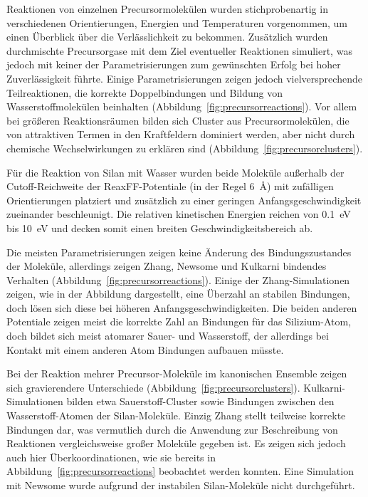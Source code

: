 Reaktionen von einzelnen Precursormolekülen wurden stichprobenartig in verschiedenen Orientierungen, Energien und Temperaturen vorgenommen, um einen Überblick über die Verlässlichkeit zu bekommen.
Zusätzlich wurden durchmischte Precursorgase mit dem Ziel eventueller Reaktionen simuliert, was jedoch mit keiner der Parametrisierungen zum gewünschten Erfolg bei hoher Zuverlässigkeit führte.
Einige Parametrisierungen zeigen jedoch vielversprechende Teilreaktionen, die korrekte Doppelbindungen und Bildung von Wasserstoffmolekülen beinhalten (Abbildung~\ref{fig:precursorreactions}).
Vor allem bei größeren Reaktionsräumen bilden sich Cluster aus Precursormolekülen, die von attraktiven Termen in den Kraftfeldern dominiert werden, aber nicht durch chemische Wechselwirkungen zu erklären sind (Abbildung~\ref{fig:precursorclusters}).

Für die Reaktion von Silan mit Wasser wurden beide Moleküle außerhalb der Cutoff-Reich\-weite der ReaxFF-Potentiale (in der Regel \SI{6}{\angstrom}) mit zufälligen Orientierungen platziert und zusätzlich zu einer geringen Anfangsgeschwindigkeit zueinander beschleunigt.
Die relativen kinetischen Energien reichen von \SI{0.1}{\electronvolt} bis \SI{10}{\electronvolt} und decken somit einen breiten Geschwindigkeitsbereich ab.

Die meisten Parametrisierungen zeigen keine Änderung des Bindungszustandes der Moleküle, allerdings zeigen Zhang, Newsome und Kulkarni bindendes Verhalten (Abbildung~\ref{fig:precursorreactions}).
Einige der Zhang-Simulationen zeigen, wie in der Abbildung dargestellt, eine Überzahl an stabilen Bindungen, doch lösen sich diese bei höheren Anfangsgeschwindigkeiten.
Die beiden anderen Potentiale zeigen meist die korrekte Zahl an Bindungen für das Silizium-Atom, doch bildet sich meist atomarer Sauer- und Wasserstoff, der allerdings bei Kontakt mit einem anderen Atom Bindungen aufbauen müsste.

Bei der Reaktion mehrer Precursor-Moleküle im kanonischen Ensemble zeigen sich gravierendere Unterschiede (Abbildung~\ref{fig:precursorclusters}).
Kulkarni-Simulationen bilden etwa Sauerstoff-Cluster sowie Bindungen zwischen den Wasserstoff-Atomen der Silan-Moleküle.
Einzig Zhang stellt teilweise korrekte Bindungen dar, was vermutlich durch die Anwendung zur Beschreibung von Reaktionen vergleichsweise großer Moleküle gegeben ist.
Es zeigen sich jedoch auch hier Überkoordinationen, wie sie bereits in Abbildung~\ref{fig:precursorreactions} beobachtet werden konnten.
Eine Simulation mit Newsome wurde aufgrund der instabilen Silan-Moleküle nicht durchgeführt.


